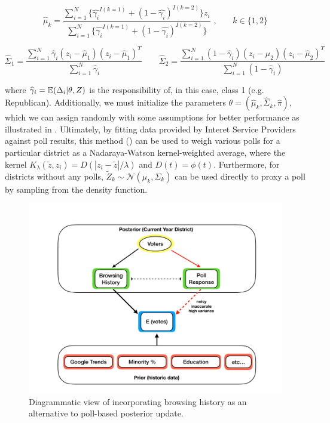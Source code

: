 \documentclass[12pt]{article}
\begin{document}
\begin{equation}
\hat{\mu}_k = \frac{\sum_{i=1}^{N}\{\hat{\gamma_i}^{I(k=1)} + (1-\hat{\gamma_i})^{I(k=2)}\}z_i}{\sum_{i=1}^{N}\{\hat{\gamma_i}^{I(k=1)} + (1-\hat{\gamma_i})^{I(k=2)}\}} \text{\ ,} \qquad k \in \{1,2\}
\label{eq:maximization1}
\end{equation}

\begin{equation}
\hat{\Sigma}_{1} = \frac{\sum_{i=1}^{N}\hat{\gamma}_i(z_i - \hat{\mu}_1)(z_i - \hat{\mu}_1)^T}{\sum_{i=1}^{N}\hat{\gamma}_i} \qquad \hat{\Sigma}_{2} = \frac{\sum_{i=1}^{N}(1-\hat{\gamma}_i)(z_i - \hat{\mu}_2)(z_i - \hat{\mu}_2)^T}{\sum_{i=1}^{N}(1-\hat{\gamma}_i)}
\label{eq:maximization2}
\end{equation}

where $\widehat{\gamma}_i = \mathbb{E}(\Delta_i|\theta, Z)$ is the responsibility of, in this case, class 1 (e.g. Republican). Additionally, we must initialize the parameters $\theta = (\hat{\mu}_k, \hat{\Sigma}_k, \hat{\pi})$, which we can assign randomly with some  assumptions for better performance as illustrated in \cite{comarela2018browse}. Ultimately, by fitting data provided by Interet Service Providers against poll results, this method () can be used to weigh various polls for a particular district as a Nadaraya-Watson kernel-weighted average, where the kernel $K_{\lambda}(\tilde{z}, z_i) = D(|z_i-\tilde{z}|/\lambda)$ and $D(t) = \phi(t)$. Furthermore, for districts without any polls, $\tilde{Z}_k \sim \mathcal{N}(\mu_k, \Sigma_k)$ can be used directly to proxy a poll by sampling from the density function.  

\begin{figure}[tbh]
  \centering
  \includegraphics[scale=0.3]{browsing_diagram.pdf}
  \caption{Diagrammatic view of incorporating browsing history as an alternative to poll-based posterior update.}
  \label{fig:browsing}
\end{figure}
\end{document}
